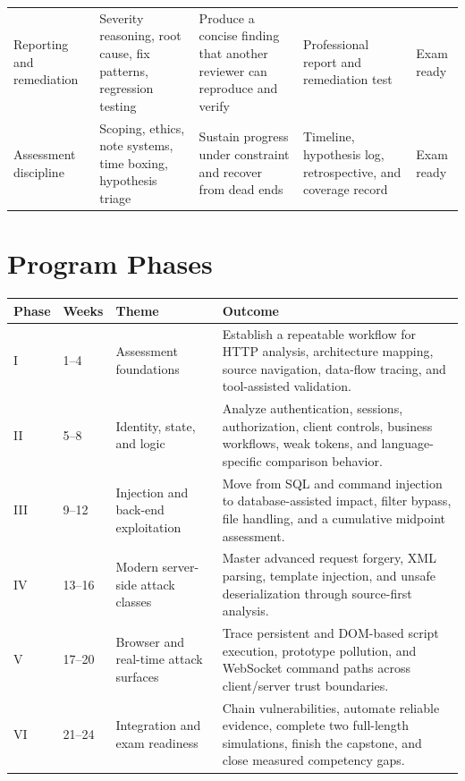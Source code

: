 \documentclass[11pt]{article}
\begin{document}
\begin{longtable}{@{}L{0.17\textwidth}L{0.17\textwidth}L{0.19\textwidth}L{0.18\textwidth}L{\tabcolsep\relax}@{}}
Reporting and remediation & Severity reasoning, root cause, fix patterns, regression testing & Produce a concise finding that another reviewer can reproduce and verify & Professional report and remediation test & Exam ready \\
Assessment discipline & Scoping, ethics, note systems, time boxing, hypothesis triage & Sustain progress under constraint and recover from dead ends & Timeline, hypothesis log, retrospective, and coverage record & Exam ready \\
\bottomrule
\end{longtable}
\normalsize

\section{Program Phases}

\begin{longtable}{@{}L{0.08\textwidth}L{0.18\textwidth}L{0.21\textwidth}L{0.43\textwidth}@{}}
\toprule
\textbf{Phase} & \textbf{Weeks} & \textbf{Theme} & \textbf{Outcome} \\
\midrule
\endhead
I & 1--4 & Assessment foundations & Establish a repeatable workflow for HTTP analysis, architecture mapping, source navigation, data-flow tracing, and tool-assisted validation. \\
II & 5--8 & Identity, state, and logic & Analyze authentication, sessions, authorization, client controls, business workflows, weak tokens, and language-specific comparison behavior. \\
III & 9--12 & Injection and back-end exploitation & Move from SQL and command injection to database-assisted impact, filter bypass, file handling, and a cumulative midpoint assessment. \\
IV & 13--16 & Modern server-side attack classes & Master advanced request forgery, XML parsing, template injection, and unsafe deserialization through source-first analysis. \\
V & 17--20 & Browser and real-time attack surfaces & Trace persistent and DOM-based script execution, prototype pollution, and WebSocket command paths across client/server trust boundaries. \\
VI & 21--24 & Integration and exam readiness & Chain vulnerabilities, automate reliable evidence, complete two full-length simulations, finish the capstone, and close measured competency gaps. \\
\bottomrule
\end{longtable}
\end{document}
